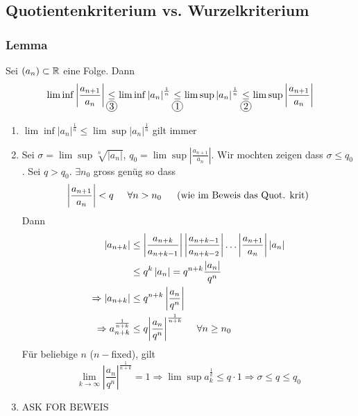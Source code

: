 \subsection*{Quotientenkriterium vs. Wurzelkriterium}

\subsubsection*{Lemma }
Sei $\left( a_n\right) \subset\mathbb{R}$ eine Folge. Dann 
\[\lim \inf \left| {\frac{{{a_{n + 1}}}}{{{a_n}}}} \right|\mathop  \le \limits_{\mycirc{3}} \lim \inf {\left| {{a_n}} \right|^{\frac{1}{n}}}\mathop  \le \limits_{\mycirc{1}} \lim \sup {\left| {{a_n}} \right|^{\frac{1}{n}}}\mathop  \le \limits_{\mycirc{2}} \lim \sup \left| {\frac{{{a_{n + 1}}}}{{{a_n}}}} \right|\]
\begin{beweis}{}
\begin{enumerate}
\item $\lim \inf {\left| {{a_n}} \right|^{\frac{1}{n}}} \le \lim \sup {\left| {{a_n}} \right|^{\frac{1}{n}}}$ gilt immer
\item Sei $\sigma  = \lim \sup \sqrt[n]{{\left| {{a_n}} \right|}}$, ${q_0} = \lim \sup \left| {\frac{{{a_{n + 1}}}}{{{a_n}}}} \right|$. Wir mochten zeigen dass $\sigma \leq q_0$. Sei $q>q_0$. $\exists n_0$ gross genüg so dass 
\[\left| {\frac{{{a_{n + 1}}}}{{{a_n}}}} \right| < q\hspace{5mm}\forall n > {n_0}\hspace{5mm}\left(\text{wie im Beweis das Quot. krit}\right)\]
Dann 
\begin{align*}
\left| {{a_{n + k}}} \right| &\le \left| {\frac{{{a_{n + k}}}}{{{a_{n + k - 1}}}}} \right|\left| {\frac{{{a_{n + k - 1}}}}{{{a_{n + k - 2}}}}} \right| \ldots \left| {\frac{{{a_{n + 1}}}}{{{a_n}}}} \right|\left| {{a_n}} \right|\\
 &\le {q^k}\left| {{a_n}} \right| = {q^{n + k}}\frac{{\left| {{a_n}} \right|}}{{{q^n}}}\\
 \Rightarrow \left| {{a_{n + k}}} \right| &\le {q^{n + k}}\left| {\frac{{{a_n}}}{{{q^n}}}} \right|\\
 \Rightarrow a_{n + k}^{\frac{1}{{n + k}}} &\le q{\left| {\frac{{{a_n}}}{{{q^n}}}} \right|^{\frac{1}{{n + k}}}}\hspace{5mm}\forall n \ge {n_0}
\end{align*}
Für beliebige $n$ ($n-$fixed), gilt
\[\mathop {\lim }\limits_{k \to \infty } {\left| {\frac{{{a_n}}}{{{q^n}}}} \right|^{\frac{1}{{n + k}}}} = 1 \Rightarrow \lim \sup a_k^{\frac{1}{k}} \le q \cdot 1 \Rightarrow \sigma  \le q \le {q_0}\]
\item ASK FOR BEWEIS
\end{enumerate}
\end{beweis}

